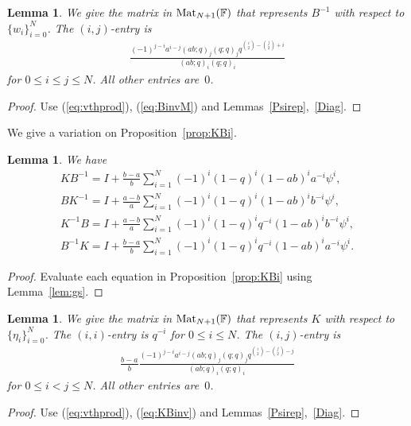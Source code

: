 \documentclass[pdftex]{sigma}
\numberwithin{equation}{section}
\newtheorem{Lemma}[Theorem]{Lemma}
\begin{document}
\begin{Lemma}\label{Biwj}
We give the matrix in
${\rm Mat}_{N+1}(\mathbb F)$ that represents $B^{-1}$ with respect to
$\lbrace w_i \rbrace_{i=0}^N$.
The $(i,j)$-entry is
\begin{gather*}
\frac{(-1)^{j-i} a^{i-j} (ab;q)_j (q;q)_j q^{\binom{i}{2}-\binom{j}{2}+i}
}{(ab;q)_i (q;q)_i}
\end{gather*}
for $0 \leq i\leq j\leq N$.
All other entries are~$0$.
\end{Lemma}
\begin{proof} Use
(\ref{eq:vthprod}),
(\ref{eq:BinvM})
and Lemmas~\ref{Psirep},~\ref{Diag}.
\end{proof}

We give a variation on Proposition~\ref{prop:KBi}.

\begin{Lemma} We have
\begin{gather}
KB^{-1} = I + \frac{b-a}{b} \sum_{i=1}^N
(-1)^i (1-q)^i (1-ab)^i a^{-i} \psi^i,
\label{eq:KBinv}\\
BK^{-1} = I + \frac{a-b}{a} \sum_{i=1}^N
(-1)^i (1-q)^i (1-ab)^i b^{-i} \psi^i,
\label{eq:BKinv}\\
K^{-1}B = I + \frac{a-b}{a} \sum_{i=1}^N
(-1)^i (1-q)^i q^{-i} (1-ab)^i b^{-i} \psi^i,
\label{eq:KinvB}\\
B^{-1}K = I + \frac{b-a}{b} \sum_{i=1}^N
(-1)^i (1-q)^i q^{-i} (1-ab)^i a^{-i} \psi^i.
\label{eq:BinvK}
\end{gather}
\end{Lemma}
\begin{proof} Evaluate each equation in Proposition~\ref{prop:KBi} using Lemma~\ref{lem:gs}.
\end{proof}

\begin{Lemma}\label{Ketaj}
We give the matrix in
${\rm Mat}_{N+1}(\mathbb F)$ that represents $K$ with respect to
$\lbrace \eta_i \rbrace_{i=0}^N$.
The $(i,i)$-entry is $q^{-i}$ for $0 \leq i \leq N$.
The $(i,j)$-entry is
\begin{gather*}
\frac{b-a}{b}
\frac{(-1)^{j-i} a^{i-j} (ab;q)_j (q;q)_j q^{\binom{i}{2}-\binom{j}{2}-j}
}{(ab;q)_i (q;q)_i}
\end{gather*}
for $0 \leq i< j\leq N$.
All other entries are~$0$.
\end{Lemma}
\begin{proof} Use (\ref{eq:vthprod}), (\ref{eq:KBinv}) and Lemmas~\ref{Psirep},~\ref{Diag}.
\end{proof}
\end{document}
